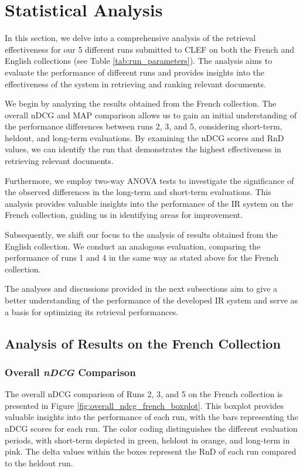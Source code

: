 \section{Statistical Analysis}
\label{sec:analysis}

In this section, we delve into a comprehensive analysis of the retrieval effectiveness for our 5 different runs submitted to \ac{CLEF} on both the French and English collections (see Table \ref{tab:run_parameters}). 
The analysis aims to evaluate the performance of different runs and provides insights into the effectiveness of the system in retrieving and ranking relevant documents.

We begin by analyzing the results obtained from the French collection. 
The overall \ac{nDCG} and \ac{MAP} comparison allows us to gain an initial understanding of the performance differences between runs 2, 3, and 5, considering short-term, heldout, and long-term evaluations. 
By examining the \ac{nDCG} scores and \ac{RnD} values, we can identify the run that demonstrates the highest effectiveness in retrieving relevant documents.

Furthermore, we employ two-way \ac{ANOVA} tests to investigate the significance of the observed differences in the long-term and short-term evaluations. 
This analysis provides valuable insights into the performance of the \ac{IR} system on the French collection, guiding us in identifying areas for improvement.

Subsequently, we shift our focus to the analysis of results obtained from the English collection. 
We conduct an analogous evaluation, comparing the performance of runs 1 and 4 in the same way as stated above for the French collection. 

The analyses and discussions provided in the next subsections aim to give a better understanding of the performance of the developed \ac{IR} system and serve as a basis for optimizing its retrieval performances.


\newpage
\subsection{Analysis of Results on the French Collection}
\enlargethispage{5\baselineskip}
\subsubsection{Overall \textit{nDCG} Comparison}  \label{sec:ndcg_comparison_french}

The overall \ac{nDCG} comparison of Runs 2, 3, and 5 on the French collection is presented in Figure \ref{fig:overall_ndcg_french_boxplot}. 
This boxplot provides valuable insights into the performance of each run, with the bars representing the \ac{nDCG} scores for each run. 
The color coding distinguishes the different evaluation periods, with short-term depicted in green, heldout in orange, and long-term in pink. 
The delta values within the boxes represent the \ac{RnD} of each run compared to the heldout run.

